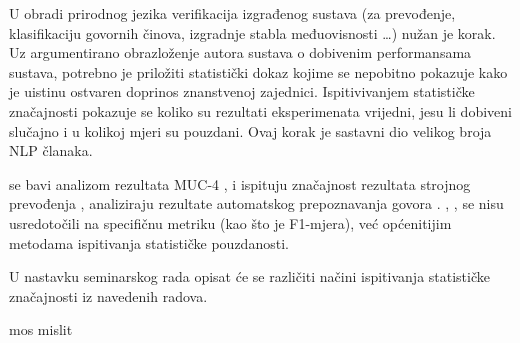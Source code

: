 U obradi prirodnog jezika  verifikacija izgrađenog sustava (za prevođenje, klasifikaciju govornih činova, izgradnje stabla međuovisnosti \dots) nužan je korak. Uz argumentirano obrazloženje autora sustava o dobivenim performansama sustava, potrebno je priložiti statistički dokaz kojime se nepobitno pokazuje kako je uistinu ostvaren doprinos znanstvenoj zajednici. Ispitivivanjem statističke značajnosti pokazuje se koliko su rezultati eksperimenata vrijedni, jesu li dobiveni slučajno i u kolikoj mjeri su pouzdani. Ovaj korak je sastavni dio velikog broja NLP članaka.

\citep{chinchor1992statistical} se bavi analizom rezultata MUC-4 , \citep{koehn2004statistical} i \citep{zhang2004interpreting} ispituju značajnost rezultata strojnog prevođenja , \citep{bisani2004bootstrap} analiziraju rezultate automatskog prepoznavanja govora . \citep{berg2012empirical}, \citep{yeh2000more} , \citep{thompson1993use} se nisu usredotočili na specifičnu metriku (kao što je F1-mjera), već općenitijim metodama ispitivanja statističke pouzdanosti.

U nastavku seminarskog rada opisat će se različiti načini ispitivanja statističke značajnosti iz navedenih radova.  

mos mislit